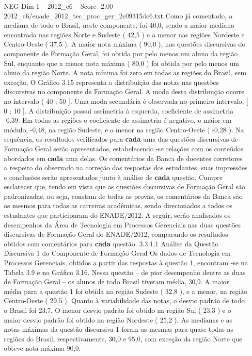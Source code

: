 \begin{textsample}{NEG Dim 1 – 2012\_c6 – Score -2.00 – 2012\_c6/enade\_2012\_tec\_proc\_ger\_2c09315dc6.txt}
Como já comentado, a mediana de todo o Brasil, neste componente, foi 40,0, sendo a maior mediana encontrada nas regiões Norte e Sudeste ( 42,5 ) e a menor nas regiões Nordeste e Centro-Oeste ( 37,5 ).
A maior nota máxima ( 90,0 ), nas questões discursivas do componente de Formação Geral, foi obtida por pelo menos um aluno da região Sul, enquanto que a menor nota máxima ( 80,0 ) foi obtida por pelo menos um aluno da região Norte.
A nota mínima foi zero em todas as regiões do Brasil, sem exceção.
O Gráfico 3.15 representa a distribuição das notas nas questões discursivas no componente de Formação Geral.
A moda desta distribuição ocorre no intervalo ( 40 ; 50 ].
Uma moda secundária é observada no primeiro intervalo, [ 0 ; 10 ].
A distribuição possui assimetria à esquerda, coeficiente de assimetria -0,39.
Em todas as regiões o coeficiente de assimetria é negativo, o maior em módulo, -0,48, na região Sudeste, e o menor na região Centro-Oeste ( -0,28 ).
Na sequência, os resultados verificados para \textbf{cada} uma das questões discursivas de Formação Geral serão apresentados, estabelecendo -se relações com os conteúdos abordados em \textbf{cada} uma delas.
Os comentários da Banca de docentes corretores a respeito do observado na correção das respostas dos estudantes, suas impressões e conclusões serão apresentados junto à análise de \textbf{cada} questão.
Cumpre esclarecer que, tendo em vista que as questões discursivas de Formação Geral são padronizadas, ou seja, constam de todas as provas, os comentários da Banca são os mesmos para todas as carreiras acadêmicas, sendo direcionados a todos os estudantes que participaram do ENADE/2012.
A seguir, serão analisados os desempenhos da Área de Tecnologia em Processos Gerenciais nas duas questões discursivas de Formação Geral do ENADE/2012, comparando os resultados obtidos com comentários para \textbf{cada} questão. 3.3.1.1 Análise da Questão Discursiva 1 do Componente de Formação Geral Os dados de Tecnologia em Processos Gerenciais, obtidos a partir das respostas à questão 1, encontram -se na Tabela 3.9 e no Gráfico 3.16.
Nessa questão – de pior desempenho dentre as duas de Formação Geral – os alunos de todo Brasil tiveram média, 30,9.
A maior média para a questão 1 foi obtida na região Sudeste ( 32,8 ), e a menor, na região Centro-Oeste ( 29,5 ).
Quanto à variabilidade das notas, o desvio padrão de todo o Brasil foi 23,7.
O menor desvio padrão foi obtido na região Sul ( 23,3 ) e o maior desvio padrão foi obtido na região Nordeste ( 25,2 ).
As medianas e as notas máximas da questão discursiva 1 foram as mesmas para quase todas as regiões do Brasil, respectivamente, 30,0 e 95,0, com exceção da região Norte que obteve nota máxima 90,0.

\end{textsample}
